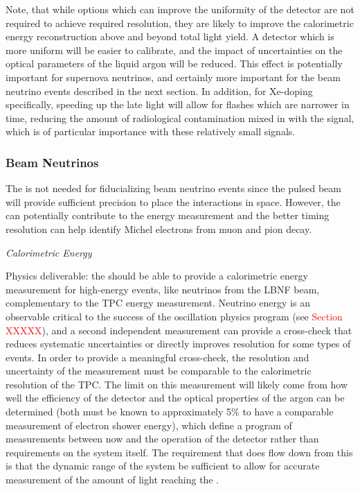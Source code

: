 Note, that while options which can improve the uniformity of the detector are not required to achieve required resolution, they are likely to improve the calorimetric energy reconstruction above and beyond total light yield. A detector which is more uniform will be easier to calibrate, and the impact of uncertainties on the optical parameters of the liquid argon will be reduced. This effect is potentially important for supernova neutrinos, and certainly more important for the beam neutrino events described in the next section. In addition, for Xe-doping specifically, speeding up the late light will allow for flashes which are narrower in time, reducing the amount of radiological contamination mixed in with the signal, which is of particular importance with these relatively small signals.



\subsubsection{Beam Neutrinos}
\label{subsec:fdsp-pd-simphys-beam}

The  is not needed for fiducializing beam neutrino events since the pulsed beam will provide sufficient precision to place the interactions in space. However, the  can potentially contribute to the energy measurement and the better timing resolution can help identify Michel electrons from muon and pion decay.


\textit{\it Calorimetric Energy}

Physics deliverable: the  should be able to provide a calorimetric energy measurement for high-energy events, like neutrinos from the LBNF beam, complementary to the TPC energy measurement.
Neutrino energy is an observable critical to the success of the oscillation physics program (see \textcolor{red}{Section XXXXX}), and a second independent measurement can provide a cross-check that reduces systematic uncertainties or directly improves resolution for some types of events. In order to provide a meaningful cross-check, the resolution and uncertainty of the  measurement must be comparable to the calorimetric resolution of the TPC. The limit on this measurement will likely come from how well the efficiency of the detector and the optical properties of the argon can be determined (both must be known to approximately 5\% to have a comparable measurement of electron shower energy), which define a program of measurements between now and the operation of the detector rather than requirements on the system itself. The requirement that does flow down from this is that the dynamic range of the system be sufficient to allow for accurate measurement of the amount of light reaching the . 

